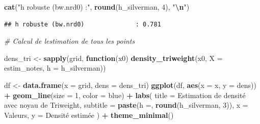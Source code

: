 \documentclass[
  12pt,
]{article}
\newenvironment{Shaded}{\begin{snugshade}}{\end{snugshade}}
\newcommand{\AttributeTok}[1]{\textcolor[rgb]{0.13,0.29,0.53}{#1}}
\newcommand{\CommentTok}[1]{\textcolor[rgb]{0.56,0.35,0.01}{\textit{#1}}}
\newcommand{\ControlFlowTok}[1]{\textcolor[rgb]{0.13,0.29,0.53}{\textbf{#1}}}
\newcommand{\DecValTok}[1]{\textcolor[rgb]{0.00,0.00,0.81}{#1}}
\newcommand{\FunctionTok}[1]{\textcolor[rgb]{0.13,0.29,0.53}{\textbf{#1}}}
\newcommand{\NormalTok}[1]{#1}
\newcommand{\OtherTok}[1]{\textcolor[rgb]{0.56,0.35,0.01}{#1}}
\newcommand{\SpecialCharTok}[1]{\textcolor[rgb]{0.81,0.36,0.00}{\textbf{#1}}}
\newcommand{\StringTok}[1]{\textcolor[rgb]{0.31,0.60,0.02}{#1}}
\begin{document}
\begin{Shaded}
\begin{Highlighting}[]
\FunctionTok{cat}\NormalTok{(}\StringTok{"h robuste (bw.nrd0)              :"}\NormalTok{, }\FunctionTok{round}\NormalTok{(h\_silverman, }\DecValTok{4}\NormalTok{), }\StringTok{"}\SpecialCharTok{\textbackslash{}n}\StringTok{"}\NormalTok{)}
\end{Highlighting}
\end{Shaded}

\begin{verbatim}
## h robuste (bw.nrd0)              : 0.781
\end{verbatim}

\begin{Shaded}
\begin{Highlighting}[]
\CommentTok{\# Calcul de l\textquotesingle{}estimation de tous les points}

\NormalTok{dens\_tri }\OtherTok{\textless{}{-}} \FunctionTok{sapply}\NormalTok{(grid, }\ControlFlowTok{function}\NormalTok{(x0) }\FunctionTok{density\_triweight}\NormalTok{(x0, }\AttributeTok{X =}\NormalTok{ estim\_notes, }\AttributeTok{h =}\NormalTok{ h\_silverman))}
\end{Highlighting}
\end{Shaded}

\begin{Shaded}
\begin{Highlighting}[]
\NormalTok{df }\OtherTok{\textless{}{-}} \FunctionTok{data.frame}\NormalTok{(}\AttributeTok{x =}\NormalTok{ grid, }\AttributeTok{dens =}\NormalTok{ dens\_tri)}
\FunctionTok{ggplot}\NormalTok{(df, }\FunctionTok{aes}\NormalTok{(}\AttributeTok{x =}\NormalTok{ x, }\AttributeTok{y =}\NormalTok{ dens)) }\SpecialCharTok{+}
  \FunctionTok{geom\_line}\NormalTok{(}\AttributeTok{size =} \DecValTok{1}\NormalTok{, }\AttributeTok{color =} \StringTok{\textquotesingle{}blue\textquotesingle{}}\NormalTok{) }\SpecialCharTok{+}
  \FunctionTok{labs}\NormalTok{(}
    \AttributeTok{title =} \StringTok{\textquotesingle{}Estimation de densité avec noyau de Triweight\textquotesingle{}}\NormalTok{,}
    \AttributeTok{subtitle =} \FunctionTok{paste}\NormalTok{(}\StringTok{\textquotesingle{}h =\textquotesingle{}}\NormalTok{, }\FunctionTok{round}\NormalTok{(h\_silverman, }\DecValTok{3}\NormalTok{)),}
    \AttributeTok{x =} \StringTok{\textquotesingle{}Valeurs\textquotesingle{}}\NormalTok{, }\AttributeTok{y =} \StringTok{\textquotesingle{}Densité estimée\textquotesingle{}}
\NormalTok{  ) }\SpecialCharTok{+}
  \FunctionTok{theme\_minimal}\NormalTok{()}
\end{Highlighting}
\end{Shaded}
\end{document}
